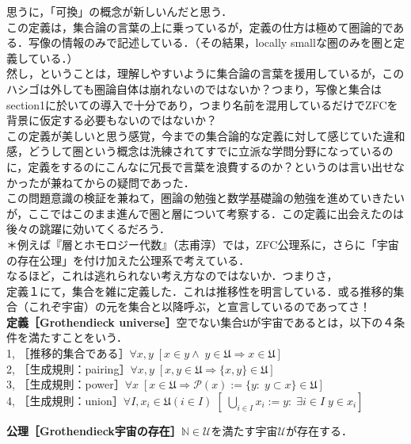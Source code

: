 \documentclass[uplatex, 12pt, a4paper, dvipdfmx]{jsarticle}
\begin{document}
思うに，「可換」の概念が新しいんだと思う．\\
この定義は，集合論の言葉の上に乗っているが，定義の仕方は極めて圏論的である．写像の情報のみで記述している．（その結果，locally smallな圏のみを圏と定義している．）\\
然し，ということは，理解しやすいように集合論の言葉を援用しているが，このハシゴは外しても圏論自体は崩れないのではないか？つまり，写像と集合はsection1に於いての導入で十分であり，つまり名前を混用しているだけでZFCを背景に仮定する必要もないのではないか？\\
この定義が美しいと思う感覚，今までの集合論的な定義に対して感じていた違和感，どうして圏という概念は洗練されてすでに立派な学問分野になっているのに，定義をするのにこんなに冗長で言葉を浪費するのか？というのは言い出せなかったが兼ねてからの疑問であった．\\
この問題意識の検証を兼ねて，圏論の勉強と数学基礎論の勉強を進めていきたいが，ここではこのまま進んで圏と層について考察する．この定義に出会えたのは後々の跳躍に効いてくるだろう．\\

\noindent
＊例えば『層とホモロジー代数』（志甫淳）では，ZFC公理系に，さらに「宇宙の存在公理」を付け加えた公理系で考えている．\\
なるほど，これは逃れられない考え方なのではないか．つまりさ，\\
定義１にて，集合を雑に定義した．これは推移性を明言している．或る推移的集合（これぞ宇宙）の元を集合と以降呼ぶ，と宣言しているのであってさ！\\

\vspace{3mm}
\textbf{定義［Grothendieck universe］}空でない集合$\mathfrak{U}$が宇宙であるとは，以下の４条件を満たすことをいう．\\
1, ［推移的集合である］$\forall x,y \; [x\in y \wedge \; y\in \mathfrak{U} \Longrightarrow x\in \mathfrak{U}]$\\
2, ［生成規則：pairing］$\forall x,y \; [x,y\in \mathfrak{U} \Longrightarrow \{ x,y\} \in \mathfrak{U}]$\\
3, ［生成規則：power］$\forall x \; [x\in\mathfrak{U} \Longrightarrow \mathcal{P}(x):=\{ y:\; y \subset x\} \in \mathfrak{U}]$\\
4, ［生成規則：union］$\forall I,x_i \in \mathfrak{U}(i\in I) \; [\; \bigcup_{i\in I} x_i := {y:\; \exists i\in I \; y\in x_i}]$

\textbf{公理［Grothendieck宇宙の存在］}$\mathbb{N}\in\mathcal{U}$を満たす宇宙$\mathcal{U}$が存在する．
\end{document}
